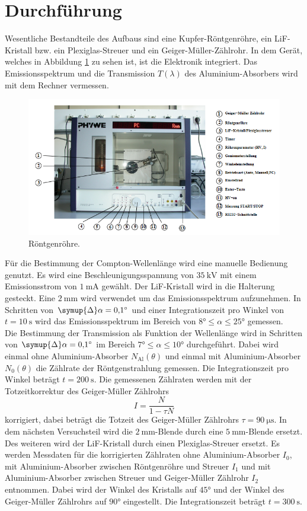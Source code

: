 \section{Durchführung}
\label{sec:Durchführung}
Wesentliche Bestandteile des Aufbaus sind eine Kupfer-Röntgenröhre, ein LiF-Kristall bzw. ein Plexiglas-Streuer und ein Geiger-Müller-Zählrohr.
In dem Gerät, welches in Abbildung \ref{fig:rön} zu sehen ist, ist die Elektronik integriert. Das Emissionsspektrum und die Transmission $T(\lambda)$ des Aluminium-Absorbers wird mit dem Rechner vermessen.
\begin{figure}
    \centering
    \caption{Röntgenröhre.\cite{v603}}
    \label{fig:rön}
    \includegraphics[width = 0.6 \textwidth]{pics/röntgenröhre.png}
\end{figure}
Für die Bestimmung der Compton-Wellenlänge wird eine manuelle Bedienung genutzt. Es wird eine Beschleunigungsspannung von $\SI{35}{\kilo \volt}$ mit einem Emissionsstrom von $\SI{1}{\milli \ampere}$ gewählt.
Der LiF-Kristall wird in die Halterung gesteckt. Eine $\SI{2}{\milli \metre}$ wird verwendet um das Emissionsspektrum aufzunehmen. In Schritten von $\symup{\Delta}\alpha=\ang{0.1;;}$ und einer Integrationszeit pro Winkel von $t=\SI{10}{\second}$
wird das Emissionsspektrum im Bereich von $\ang{8;;} \leq \alpha \leq \ang{25;;}$ gemessen. 
\\
Die Bestimmung der Transmission als Funktion der Wellenlänge wird in Schritten von $\symup{\Delta}\alpha=\ang{0.1;;}$ im Bereich $\ang{7;;} \leq \alpha \leq \ang{10;;}$ durchgeführt.
Dabei wird einmal ohne Aluminium-Absorber $N_\text{Al}(\theta)$ und einmal mit Aluminium-Absorber $N_0(\theta)$ die Zählrate der Röntgenstrahlung gemessen. Die Integrationszeit pro Winkel beträgt
$t=\SI{200}{\second}$. Die gemessenen Zählraten werden mit der Totzeitkorrektur des Geiger-Müller Zählrohrs
\begin{equation}
    I=\frac{N}{1-\tau N}
    \label{eqn:tot}
\end{equation}
korrigiert, dabei beträgt die Totzeit des Geiger-Müller Zählrohrs $\tau=\SI{90}{\micro \second}$.
In dem nächsten Versuchsteil wird die $\SI{2}{\milli \metre}$-Blende durch eine $\SI{5}{\milli \metre}$-Blende ersetzt. Des weiteren wird der LiF-Kristall
durch einen Plexiglas-Streuer ersetzt. Es werden Messdaten für die korrigierten Zählraten ohne Aluminium-Absorber $I_0$, mit Aluminium-Absorber zwischen Röntgenröhre und Streuer $I_1$ und mit Aluminium-Absorber zwischen Streuer und Geiger-Müller Zählrohr $I_2$ entnommen.
Dabei wird der Winkel des Kristalls auf $\ang{45;;}$ und der Winkel des Geiger-Müller Zählrohrs auf $\ang{90;;}$ eingestellt. Die Integrationszeit beträgt $t=\SI{300}{\second}$.